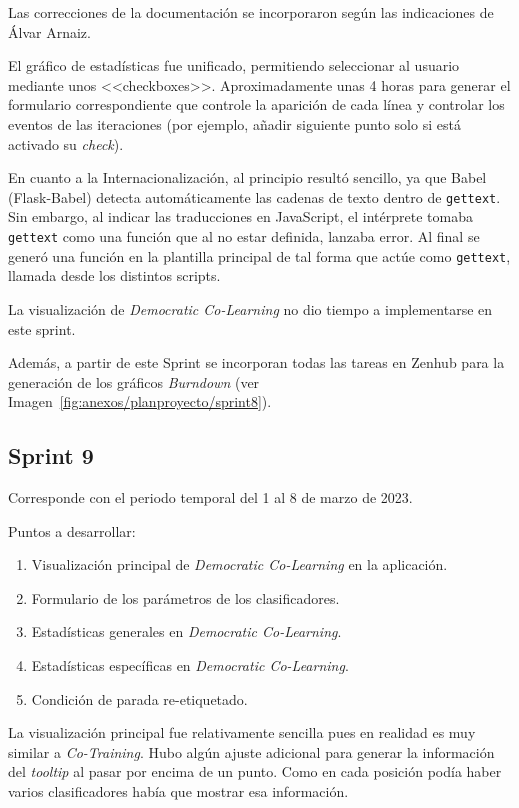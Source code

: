 Las correcciones de la documentación se incorporaron según las indicaciones de
Álvar Arnaiz.

El gráfico de estadísticas fue unificado, permitiendo seleccionar al usuario
mediante unos <<checkboxes>>. Aproximadamente unas 4 horas para generar el
formulario correspondiente que controle la aparición de cada línea y controlar
los eventos de las iteraciones (por ejemplo, añadir siguiente punto solo si está
activado su \textit{check}).

En cuanto a la Internacionalización, al principio resultó sencillo, ya que Babel
(Flask-Babel) detecta automáticamente las cadenas de texto dentro de
\texttt{gettext}. Sin embargo, al indicar las traducciones en JavaScript, el
intérprete tomaba \texttt{gettext} como una función que al no estar definida,
lanzaba error. Al final se generó una función en la plantilla principal de tal
forma que actúe como \texttt{gettext}, llamada desde los distintos scripts.

La visualización de \textit{Democratic Co-Learning} no dio tiempo a
implementarse en este sprint.

Además, a partir de este Sprint se incorporan todas las tareas en Zenhub para la
generación de los gráficos \textit{Burndown} (ver
Imagen~\ref{fig:anexos/planproyecto/sprint8}).



\subsection{Sprint 9}
Corresponde con el periodo temporal del 1 al 8 de marzo de 2023.

Puntos a desarrollar:
\begin{enumerate}
    \item Visualización principal de \textit{Democratic Co-Learning} en la aplicación.
    \item Formulario de los parámetros de los clasificadores.
    \item Estadísticas generales en \textit{Democratic Co-Learning}.
    \item Estadísticas específicas en \textit{Democratic Co-Learning}.
    \item Condición de parada re-etiquetado.
\end{enumerate}

La visualización principal fue relativamente sencilla pues en realidad es muy
similar a \textit{Co-Training}. Hubo algún ajuste adicional para generar la
información del \textit{tooltip} al pasar por encima de un punto. Como en cada
posición podía haber varios clasificadores había que mostrar esa información.

